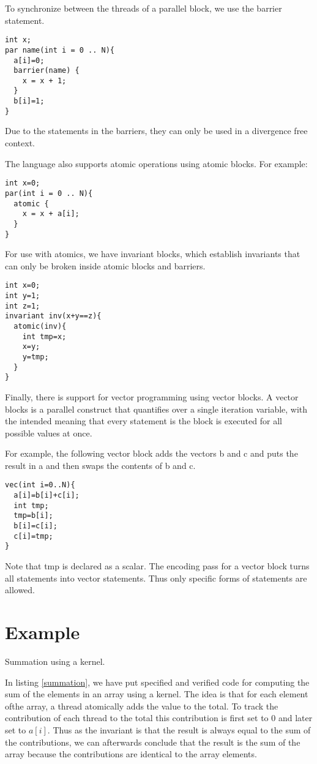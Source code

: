 To synchronize between the threads of a parallel block, we use the barrier statement.
\begin{lstlisting}
int x;
par name(int i = 0 .. N){
  a[i]=0;
  barrier(name) {
    x = x + 1;
  }
  b[i]=1;
}
\end{lstlisting}
Due to the statements in the barriers, they can only be used in
a divergence free context.

The language also supports atomic operations using atomic blocks.
For example:
\begin{lstlisting}
int x=0;
par(int i = 0 .. N){
  atomic {
    x = x + a[i];
  }
}
\end{lstlisting}

For use with atomics, we have invariant blocks, which establish invariants
that can only be broken inside atomic blocks and barriers.
\begin{lstlisting}
int x=0;
int y=1;
int z=1;
invariant inv(x+y==z){
  atomic(inv){
    int tmp=x;
    x=y;
    y=tmp;
  }
}
\end{lstlisting}

Finally, there is support for vector programming using vector blocks.
A vector blocks is a parallel construct that quantifies over a single
iteration variable, with the intended meaning that every statement is
the block is executed for all possible values at once.

For example, the following vector block adds the vectors b and c
and puts the result in a and then swaps the contents of b and c.
\begin{lstlisting}
vec(int i=0..N){
  a[i]=b[i]+c[i];
  int tmp;
  tmp=b[i];
  b[i]=c[i];
  c[i]=tmp;
}
\end{lstlisting}
Note that tmp is declared as a scalar. The encoding pass for a vector block
turns all statements into vector statements. Thus only specific forms of statements are allowed.

\section{Example}

\begin{listing}

\caption{Summation using a kernel.}
\label{summation}
\end{listing}

In listing \ref{summation}, we have put specified and verified code
for computing the sum of the elements in an array using a kernel.
The idea is that for each element ofthe array, a thread atomically adds the
value to the total. To track the contribution of each thread to the total
this contribution is first set to $0$ and later set to $a[i]$. Thus as the invariant
is that the result is always equal to the sum of the contributions,
we can afterwards conclude that the result is the sum of the array
because the contributions are identical to the array elements.

